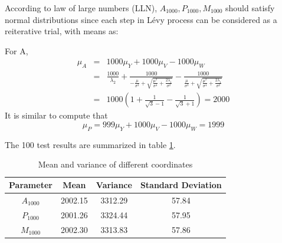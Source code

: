 According to law of large numbers (LLN), $A_{1000}, P_{1000}, M_{1000}$ should satisfy normal distributions since each step in Lévy process can be considered as a reiterative trial, with means as:

For A,  
\begin{eqnarray*}
\mu_A& = &1000\mu_Y + 1000\mu_V - 1000\mu_W\\
&=&\frac{1000}{\lambda_2} + \frac{1000}{-\frac{\mu}{\sigma^{2}}+\sqrt{\frac{\mu^{2}}{\sigma^{4}}+\frac{2 \lambda_1}{\sigma^{2}}}} - \frac{1000}{\frac{\mu}{\sigma^{2}}+\sqrt{\frac{\mu^{2}}{\sigma^{4}}+\frac{2 \lambda_1}{\sigma^{2}}}} \\
&=&1000(1+\frac{1}{\sqrt{3}-1}-\frac{1}{\sqrt{3}+1}) = 2000
\end{eqnarray*}
It is similar to compute that 
$$\mu_P = 999\mu_Y + 1000\mu_V - 1000\mu_W = 1999$$


The 100 test results are summarized in table \ref{tab:task1}.
\begin{table}[h]
    \centering
        \caption{Mean and variance of different coordinates}
    \begin{tabular}{cccc}
    \hline
      Parameter   & Mean & Variance &Standard Deviation\\ \hline
       $A_{1000}$  & 2002.15&3312.29 & 57.84\\
       $P_{1000}$  & 2001.26 & 3324.44 & 57.95\\
       $M_{1000}$ & 2002.30 & 3313.83 & 57.86\\
       \hline
    \end{tabular}
    \label{tab:task1}
\end{table}

\newpage
